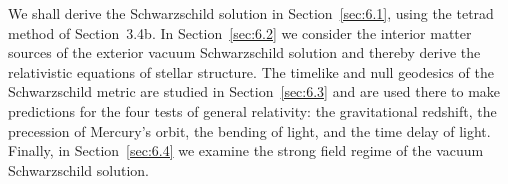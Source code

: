 We shall derive the Schwarzschild solution in Section~\ref{sec:6.1}, using the
tetrad method of Section~3.4b. In Section~\ref{sec:6.2} we consider the interior
matter sources of the exterior vacuum Schwarzschild solution and thereby derive the
relativistic equations of stellar structure. The timelike and null geodesics of the
Schwarzschild metric are studied in Section~\ref{sec:6.3} and are used there to make
predictions for the four tests of general relativity: the gravitational redshift, the
precession of Mercury's orbit, the bending of light, and the time delay of light.
Finally, in Section~\ref{sec:6.4} we examine the strong field regime of the vacuum
Schwarzschild solution.
